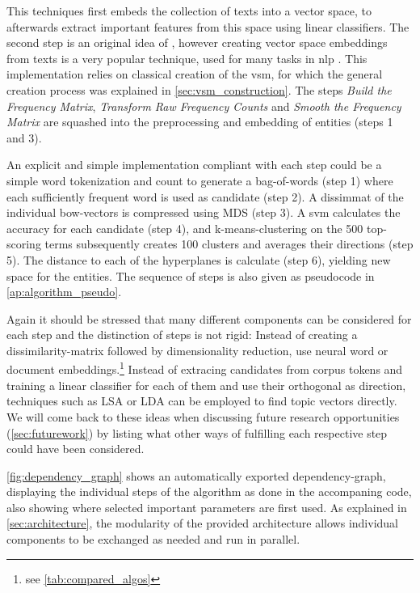 
This techniques first embeds the collection of texts into a  vector space, to afterwards extract important features from this space using linear classifiers. The second step is an original idea of \cite{Derrac2015}, however creating vector space embeddings from texts is a very popular technique, used for many tasks in \gls{nlp} \cite{Mikolov:Regularities,Mikolov2013a,Guo,Lowe,Turney2010}. This implementation relies on classical creation of the \gls{vsm}, for which the general creation process was explained in \autoref{sec:vsm_construction}. The steps \textit{Build the Frequency Matrix}, \textit{Transform Raw Frequency Counts} and \textit{Smooth the Frequency Matrix} are squashed into the preprocessing and embedding of entities (steps 1 and 3).

 An explicit and simple implementation compliant with each step could be a simple word tokenization and count to generate a bag-of-words (step 1) where each sufficiently frequent word is used as candidate (step 2). A \gls{dissimmat} of the individual \gls{bow}-vectors is compressed using MDS (step 3). A \gls{svm} calculates the accuracy for each candidate (step 4), and k-means-clustering on the 500 top-scoring terms subsequently creates 100 clusters and averages their directions (step 5). The distance to each of the hyperplanes is calculate (step 6), yielding new space for the entities. The sequence of steps is also given as pseudocode in \autoref{ap:algorithm_pseudo}. 
 
 Again it should be stressed that many different components can be considered for each step and the distinction of steps is not rigid: Instead of creating a dissimilarity-matrix followed by dimensionality reduction, \cite{Ager2018,Alshaikh2020} use neural word or document embeddings.\footnote{see \autoref{tab:compared_algos}} Instead of extracing candidates from corpus tokens and training a linear classifier for each of them and use their orthogonal as direction, techniques such as LSA or LDA can be employed to find topic vectors directly. We will come back to these ideas when discussing future research opportunities (\autoref{sec:futurework}) by listing what other ways of fulfilling each respective step could have been considered.

\autoref{fig:dependency_graph} shows an automatically exported dependency-graph, displaying the individual steps of the algorithm as done in the accompaning code, also showing where selected important parameters are first used. As explained in \autoref{sec:architecture}, the modularity of the provided architecture allows individual components to be exchanged as needed and run in parallel.


